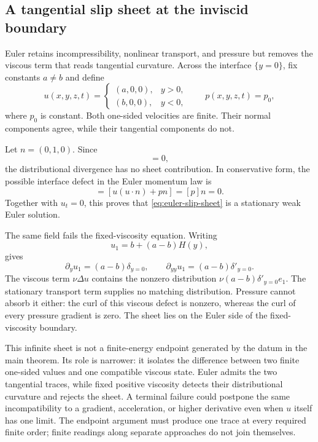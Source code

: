 \subsection{A tangential slip sheet at the inviscid boundary}
\label{sec:euler-slip}

Euler retains incompressibility, nonlinear transport, and pressure but removes
the viscous term that reads tangential curvature.  Across the interface
\(\{y=0\}\), fix constants \(a\ne b\) and define
\begin{equation}
 u(x,y,z,t)=
 \begin{cases}
  (a,0,0),&y>0,\\
  (b,0,0),&y<0,
 \end{cases}
 \qquad p(x,y,z,t)=p_0,
 \label{eq:euler-slip-sheet}
\end{equation}
where \(p_0\) is constant.  Both one-sided velocities are finite.  Their
normal components agree, while their tangential components do not.

Let \(n=(0,1,0)\).  Since
\begin{equation*}
 [u\cdot n]=0,
\end{equation*}
the distributional divergence has no sheet contribution.  In conservative
form, the possible interface defect in the Euler momentum law is
\begin{equation*}
 [(u\otimes u+pI)n]
 =[u(u\cdot n)+pn]
 =[p]n=0.
\end{equation*}
Together with \(u_t=0\), this proves that
\eqref{eq:euler-slip-sheet} is a stationary weak Euler solution.

The same field fails the fixed-viscosity equation.  Writing
\begin{equation*}
 u_1=b+(a-b)H(y),
\end{equation*}
gives
\begin{equation*}
 \partial_yu_1=(a-b)\delta_{y=0},
 \qquad
 \partial_{yy}u_1=(a-b)\delta'_{y=0}.
\end{equation*}
The viscous term \(\nu\Delta u\) contains the nonzero distribution
\(\nu(a-b)\delta'_{y=0}e_1\).  The stationary transport term supplies no
matching distribution.  Pressure cannot absorb it either: the curl of this
viscous defect is nonzero, whereas the curl of every pressure gradient is
zero.  The sheet lies on the Euler side of the fixed-viscosity
boundary.

This infinite sheet is not a finite-energy endpoint generated by the datum in
the main theorem.  Its role is narrower: it isolates the difference between
two finite one-sided values and one compatible viscous state.  Euler admits
the two tangential traces, while fixed positive viscosity detects their
distributional curvature and rejects the sheet.  A terminal failure could
postpone the same incompatibility to a gradient, acceleration, or higher
derivative even when \(u\) itself has one limit.  The endpoint argument must
produce one trace at every required finite order; finite readings along
separate approaches do not join themselves.

